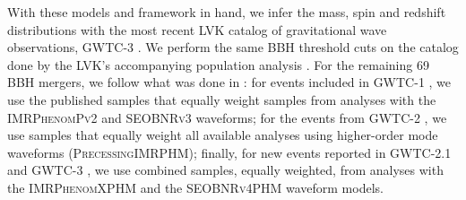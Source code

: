 With these models and framework in hand, we infer the mass, spin and redshift distributions with the most recent LVK catalog of gravitational wave observations, GWTC-3 \citep{2021arXiv211103606T}. We perform the same BBH threshold cuts on the catalog done by the LVK's accompanying population analysis \othreea{}. For the remaining 69 BBH mergers, we follow what was done in \citet{2021arXiv211103606T}: for events included in GWTC-1 \citep{2019ApJ...882L..24A}, we use the published samples that equally weight samples from analyses with the \textsc{IMRPhenomPv2} \citep{1308.3271} and \textsc{SEOBNRv3} \citep{1307.6232,1311.2544} waveforms; for the events from GWTC-2 \citep{2021ApJ...913L...7A}, we use samples that equally weight all available analyses using higher-order mode waveforms (\textsc{PrecessingIMRPHM}); finally, for new events reported in GWTC-2.1 and GWTC-3 \citep{2021arXiv211103606T,2108.01045}, we use combined samples, equally weighted, from analyses with the \textsc{IMRPhenomXPHM} \citep{2004.06503} and the \textsc{SEOBNRv4PHM} \citep{2004.09442} waveform models.

